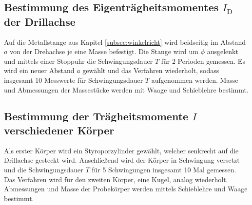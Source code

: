 \subsection{Bestimmung des Eigenträgheitsmomentes $I_{\mathup{D}}$ der Drillachse}
Auf die Metallstange aus Kapitel \ref{subsec:winkelricht} wird beidseitig im Abstand $a$ von der Drehachse je eine Masse befestigt.
Die Stange wird um $\phi$ ausgelenkt und mittels einer Stoppuhr die Schwingungsdauer $T$ für 2 Perioden gemessen. 
Es wird ein neuer Abstand $a$ gewählt und das Verfahren wiederholt, sodass insgesamt 10 Messwerte für Schwingungsdauer $T$ aufgenommen werden.
Masse und Abmessungen der Massestücke werden mit Waage und Schieblehre bestimmt.

\subsection{Bestimmung der Trägheitsmomente $I$ verschiedener Körper}
\label{subsec:traegheitkoerper}
Als erster Körper wird ein Styroporzylinder gewählt, welcher senkrecht auf die Drillachse gesteckt wird.
Anschließend wird der Körper in Schwingung versetzt und die Schwingungsdauer $T$ für 5 Schwingungen insgesamt 10 Mal gemessen. 
Das Verfahren wird für den zweiten Körper, eine Kugel, analog wiederholt.
Abmessungen und Masse der Probekörper werden mittels Schieblehre und Waage bestimmt.

